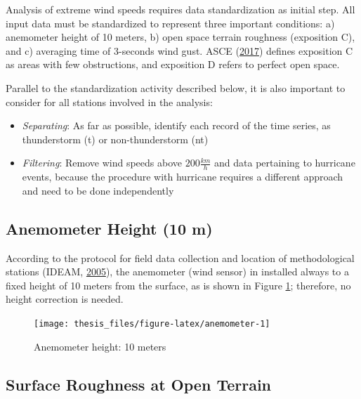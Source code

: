 \documentclass[12pt,oneside]{reedthesis}
\begin{document}
Analysis of extreme wind speeds requires data standardization as initial step. All input data must be standardized to represent three important conditions: a) anemometer height of 10 meters, b) open space terrain roughness (exposition C), and c) averaging time of 3-seconds wind gust. ASCE (\protect\hyperlink{ref-Asce2017}{2017}) defines exposition C as areas with few obstructions, and exposition D refers to perfect open space.

Parallel to the standardization activity described below, it is also important to consider for all stations involved in the analysis:
\begin{itemize}
\item
  \emph{Separating}: As far as possible, identify each record of the time series, as thunderstorm (t) or non-thunderstorm (nt)
\item
  \emph{Filtering}: Remove wind speeds above \(200 \frac{km}{h}\) and data pertaining to hurricane events, because the procedure with hurricane requires a different approach and need to be done independently
\end{itemize}
\hypertarget{anemometer-height-10-m}{%
\subsection{Anemometer Height (10 m)}\label{anemometer-height-10-m}}

According to the protocol for field data collection and location of methodological stations (IDEAM, \protect\hyperlink{ref-ideam2005}{2005}), the anemometer (wind sensor) in installed always to a fixed height of 10 meters from the surface, as is shown in Figure \ref{fig:anemometer}; therefore, no height correction is needed.
\begin{figure}

{\centering \texttt{[image: thesis\_files/figure-latex/anemometer-1]} 

}

\caption{Anemometer height: 10 meters}\label{fig:anemometer}
\end{figure}
\hypertarget{rmd-roughness}{%
\subsection{Surface Roughness at Open Terrain}\label{rmd-roughness}}
\end{document}
